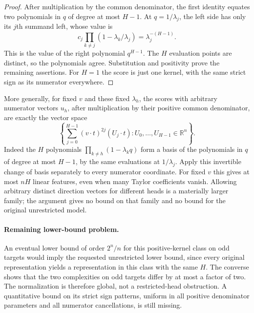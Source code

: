 \documentclass[11pt]{article}
\begin{document}
\begin{proof}
After multiplication by the common denominator, the first identity
equates two polynomials in $q$ of degree at most $H-1$. At
$q=1/\lambda_j$, the left side has only its $j$th summand left,
whose value is
\[
 c_j\prod_{k\ne j}(1-\lambda_k/\lambda_j)
 =\lambda_j^{-(H-1)}.
\]
This is the value of the right polynomial $q^{H-1}$. The $H$ evaluation
points are distinct, so the polynomials agree. Substitution and
positivity prove the remaining assertions. For $H=1$ the score is just
one kernel, with the same strict sign as its numerator everywhere.
\end{proof}

More generally, for fixed $v$ and these fixed $\lambda_h$, the scores
with arbitrary numerator vectors $u_h$, after multiplication by their
positive common denominator, are exactly the vector space
\[
 \left\{\sum_{j=0}^{H-1}(v\cdot t)^{2j}(U_j\cdot t):
                 U_0,\ldots,U_{H-1}\in\mathbb R^n\right\}.
\]
Indeed the $H$ polynomials
$\prod_{k\ne h}(1-\lambda_kq)$ form a basis of the polynomials in $q$
of degree at most $H-1$, by the same evaluations at $1/\lambda_j$.
Apply this invertible change of basis separately to every numerator
coordinate. For fixed $v$ this gives at most $nH$ linear features,
even when many Taylor coefficients vanish. Allowing arbitrary distinct
direction vectors for different heads is a materially larger family;
the argument gives no bound on that family and no bound for the
original unrestricted model.

\paragraph{Remaining lower-bound problem.}
An eventual lower bound of order $2^n/n$ for this positive-kernel class
on odd targets would imply the requested unrestricted lower bound,
since every original representation yields a representation in this
class with the same $H$. The converse shows that the two complexities
on odd targets differ by at most a factor of two. The normalization is
therefore global, not a restricted-head obstruction. A quantitative
bound on its strict sign patterns, uniform in all positive denominator
parameters and all numerator cancellations, is still missing.
\end{document}
